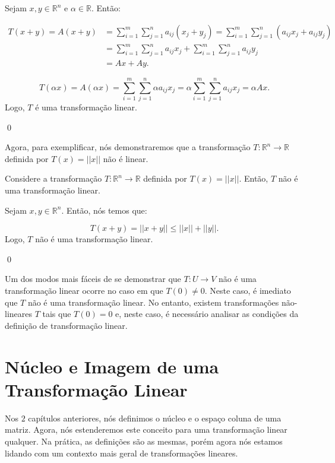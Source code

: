 \begin{Proof}
	Sejam $x, y\in\mathbb{R}^n$ e $\alpha\in\mathbb{R}$. Então:
	
	\begin{align*}
		T(x + y) = A(x + y) &= \sum\limits_{i = 1}^{m}\sum\limits_{j = 1}^n a_{ij}(x_j + y_j) = \sum\limits_{i = 1}^{m}\sum\limits_{j = 1}^{n} (a_{ij}x_j + a_{ij}y_j) \\ &= \sum\limits_{i = 1}^{m}\sum\limits_{j = 1}^{n} a_{ij}x_j + \sum\limits_{i = 1}^{m}\sum\limits_{j = 1}^{n} a_{ij}y_j \\ &= Ax + Ay.
	\end{align*}
	
	$$
	T(\alpha x) = A(\alpha x) = \sum\limits_{i = 1}^{m}\sum\limits_{j = 1}^{n}\alpha a_{ij}x_j = \alpha\sum\limits_{i = 1}^{m}\sum\limits_{j = 1}^{n} a_{ij}x_j = \alpha Ax.
	$$
	Logo, $T$ é uma transformação linear.
	
	\qed
\end{Proof}

Agora, para exemplificar, nós demonstraremos que a transformação $T:\mathbb{R}^n\to\mathbb{R}$ definida por $T(x) = ||x||$ não é linear.

\begin{Proposition}
	Considere a transformação $T:\mathbb{R}^n\to\mathbb{R}$ definida por $T(x) = ||x||$. Então, $T$ não é uma transformação linear.
\end{Proposition}

\begin{Proof}
	Sejam $x, y\in\mathbb{R}^n$. Então, nós temos que:
	
	$$
	T(x + y) = ||x + y||\leq ||x|| + ||y||.
	$$
	Logo, $T$ não é uma transformação linear.
	
	\qed
\end{Proof}

Um dos modos mais fáceis de se demonstrar que $T:U\to V$ não é uma transformação linear ocorre no caso em que $T(0)\neq 0$. Neste caso, é imediato que $T$ não é uma transformação linear. No entanto, existem transformações não-lineares $T$ tais que $T(0) = 0$ e, neste caso, é necessário analisar as condições da definição de transformação linear.

\section{Núcleo e Imagem de uma Transformação Linear}

Nos $2$ capítulos anteriores, nós definimos o núcleo e o espaço coluna de uma matriz. Agora, nós estenderemos este conceito para uma transformação linear qualquer. Na prática, as definições são as mesmas, porém agora nós estamos lidando com um contexto mais geral de transformações lineares.

